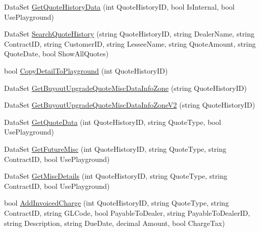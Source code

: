 \begin{DoxyCompactItemize}
\item 
Data\+Set \mbox{\hyperlink{interface_g_f_s_c_1_1_services_1_1_end_of_term_1_1_i_end_of_term_service_af93836d222e4916cbdad0db0dd952b8d}{Get\+Quote\+History\+Data}} (int Quote\+History\+ID, bool Is\+Internal, bool Use\+Playground)
\item 
Data\+Set \mbox{\hyperlink{interface_g_f_s_c_1_1_services_1_1_end_of_term_1_1_i_end_of_term_service_a3ccf167e8abf52992f98d30bfe4ae791}{Search\+Quote\+History}} (string Quote\+History\+ID, string Dealer\+Name, string Contract\+ID, string Customer\+ID, string Lessee\+Name, string Quote\+Amount, string Quote\+Date, bool Show\+All\+Quotes)
\item 
bool \mbox{\hyperlink{interface_g_f_s_c_1_1_services_1_1_end_of_term_1_1_i_end_of_term_service_a42b75253cee04256fc3160d3c3765373}{Copy\+Detail\+To\+Playground}} (int Quote\+History\+ID)
\item 
Data\+Set \mbox{\hyperlink{interface_g_f_s_c_1_1_services_1_1_end_of_term_1_1_i_end_of_term_service_ad426556103e854fcebcb2350b58688fb}{Get\+Buyout\+Upgrade\+Quote\+Misc\+Data\+Info\+Zone}} (string Quote\+History\+ID)
\item 
Data\+Set \mbox{\hyperlink{interface_g_f_s_c_1_1_services_1_1_end_of_term_1_1_i_end_of_term_service_a5453f7743fc39bc117dc375bcf06d7da}{Get\+Buyout\+Upgrade\+Quote\+Misc\+Data\+Info\+Zone\+V2}} (string Quote\+History\+ID)
\item 
Data\+Set \mbox{\hyperlink{interface_g_f_s_c_1_1_services_1_1_end_of_term_1_1_i_end_of_term_service_a8dc3dca48ca70b8a73169c748dd2759c}{Get\+Quote\+Data}} (int Quote\+History\+ID, string Quote\+Type, bool Use\+Playground)
\item 
Data\+Set \mbox{\hyperlink{interface_g_f_s_c_1_1_services_1_1_end_of_term_1_1_i_end_of_term_service_a5f385c1a557d80769b6cbcebe3ad48cc}{Get\+Future\+Misc}} (int Quote\+History\+ID, string Quote\+Type, string Contract\+ID, bool Use\+Playground)
\item 
Data\+Set \mbox{\hyperlink{interface_g_f_s_c_1_1_services_1_1_end_of_term_1_1_i_end_of_term_service_ad5f0dd91f05866aa4612e236966aa418}{Get\+Misc\+Details}} (int Quote\+History\+ID, string Quote\+Type, string Contract\+ID, bool Use\+Playground)
\item 
bool \mbox{\hyperlink{interface_g_f_s_c_1_1_services_1_1_end_of_term_1_1_i_end_of_term_service_ad9dcc5514a7bad9a4ba308d1cf72e554}{Add\+Invoiced\+Charge}} (int Quote\+History\+ID, string Quote\+Type, string Contract\+ID, string G\+L\+Code, bool Payable\+To\+Dealer, string Payable\+To\+Dealer\+ID, string Description, string Due\+Date, decimal Amount, bool Charge\+Tax)

\end{DoxyCompactItemize}
